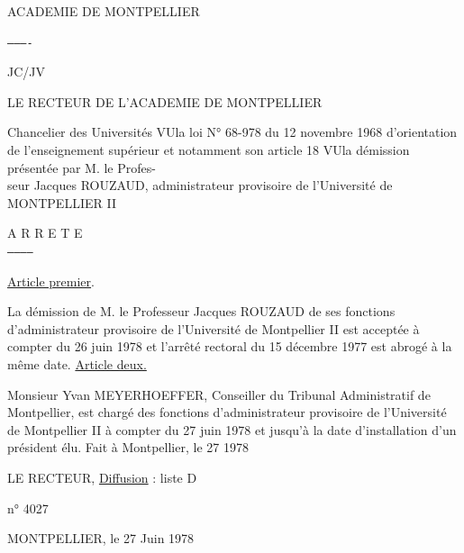 ACADEMIE DE MONTPELLIER

\texttt{----------}

JC/JV

LE RECTEUR DE L'ACADEMIE DE MONTPELLIER

Chancelier des Universités
VU\qquad la loi N° 68-978 du 12 novembre 1968 d'orientation de l'enseignement supérieur et notamment son article 18
VU\qquad la démission présentée par M. le Profes-\\
seur Jacques ROUZAUD, administrateur provisoire de l'Université de MONTPELLIER II
\begin{center}
A R R E T E\\
\texttt{-----------}
\end{center}
\uline{Article premier}.

La démission de M. le Professeur Jacques ROUZAUD de ses fonctions d'administrateur provisoire de l'Université de Montpellier II est acceptée à compter du 26 juin 1978 et l'arrêté rectoral du 15 décembre 1977 est abrogé à la même date.
\uline{Article deux.}

Monsieur Yvan MEYERHOEFFER, Conseiller du Tribunal Administratif de Montpellier, est chargé des fonctions d'administrateur provisoire de l'Université de Montpellier II à compter du 27 juin 1978 et jusqu'à la date d'installation d'un président élu.
Fait à Montpellier, le 27  1978

LE RECTEUR,
\uline{Diffusion} : liste D

n° 4027

MONTPELLIER, le 27 Juin 1978
